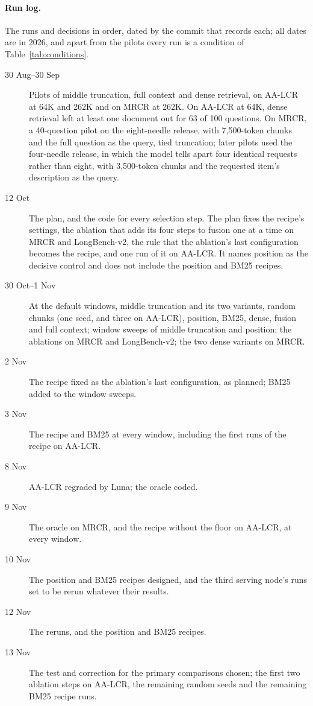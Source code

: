 \documentclass[letterpaper]{article} %
\begin{document}
\paragraph{Run log.} The runs and decisions in order, dated by the commit that records each; all dates are in 2026, and apart from the pilots every run is a condition of Table~\ref{tab:conditions}.
\begin{description}
\item[30 Aug--30 Sep] Pilots of middle truncation, full context and dense retrieval, on AA-LCR at 64K and 262K and on MRCR at 262K. On AA-LCR at 64K, dense retrieval left at least one document out for 63 of 100 questions. On MRCR, a 40-question pilot on the eight-needle release, with 7,500-token chunks and the full question as the query, tied truncation; later pilots used the four-needle release, in which the model tells apart four identical requests rather than eight, with 3,500-token chunks and the requested item's description as the query.
\item[12 Oct] The plan, and the code for every selection step. The plan fixes the recipe's settings, the ablation that adds its four steps to fusion one at a time on MRCR and LongBench-v2, the rule that the ablation's last configuration becomes the recipe, and one run of it on AA-LCR. It names position as the decisive control and does not include the position and BM25 recipes.
\item[30 Oct--1 Nov] At the default windows, middle truncation and its two variants, random chunks (one seed, and three on AA-LCR), position, BM25, dense, fusion and full context; window sweeps of middle truncation and position; the ablations on MRCR and LongBench-v2; the two dense variants on MRCR.
\item[2 Nov] The recipe fixed as the ablation's last configuration, as planned; BM25 added to the window sweeps.
\item[3 Nov] The recipe and BM25 at every window, including the first runs of the recipe on AA-LCR.
\item[8 Nov] AA-LCR regraded by Luna; the oracle coded.
\item[9 Nov] The oracle on MRCR, and the recipe without the floor on AA-LCR, at every window.
\item[10 Nov] The position and BM25 recipes designed, and the third serving node's runs set to be rerun whatever their results.
\item[12 Nov] The reruns, and the position and BM25 recipes.
\item[13 Nov] The test and correction for the primary comparisons chosen; the first two ablation steps on AA-LCR, the remaining random seeds and the remaining BM25 recipe runs.
\end{description}
\end{document}
